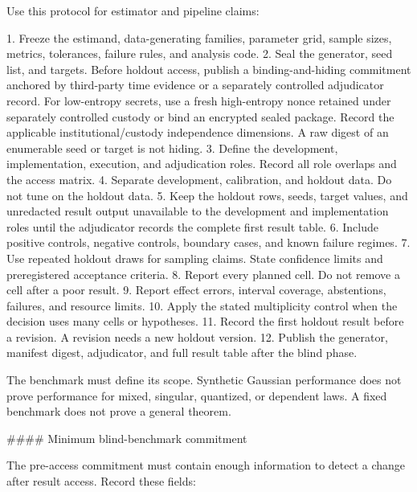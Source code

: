 \documentclass[11pt]{article}
\begin{document}
\begin{markdown}
Use this protocol for estimator and pipeline claims:

1. Freeze the estimand, data-generating families, parameter grid, sample sizes, metrics, tolerances,
   failure rules, and analysis code.
2. Seal the generator, seed list, and targets. Before holdout access, publish a binding-and-hiding
   commitment anchored by third-party time evidence or a separately controlled adjudicator record.
   For low-entropy secrets, use a fresh high-entropy nonce retained under separately controlled
   custody or bind an encrypted sealed package. Record the applicable institutional/custody
   independence dimensions. A raw digest of an enumerable seed or target is not hiding.
3. Define the development, implementation, execution, and adjudication roles. Record all role
   overlaps and the access matrix.
4. Separate development, calibration, and holdout data. Do not tune on the holdout data.
5. Keep the holdout rows, seeds, target values, and unredacted result output unavailable to the
   development and implementation roles until the adjudicator records the complete first result
   table.
6. Include positive controls, negative controls, boundary cases, and known failure regimes.
7. Use repeated holdout draws for sampling claims. State confidence limits and preregistered
   acceptance criteria.
8. Report every planned cell. Do not remove a cell after a poor result.
9. Report effect errors, interval coverage, abstentions, failures, and resource limits.
10. Apply the stated multiplicity control when the decision uses many cells or hypotheses.
11. Record the first holdout result before a revision. A revision needs a new holdout version.
12. Publish the generator, manifest digest, adjudicator, and full result table after the blind phase.

The benchmark must define its scope. Synthetic Gaussian performance does not prove performance for
mixed, singular, quantized, or dependent laws. A fixed benchmark does not prove a general theorem.

#### Minimum blind-benchmark commitment

The pre-access commitment must contain enough information to detect a change after result access.
Record these fields:


\end{markdown}
\end{document}
